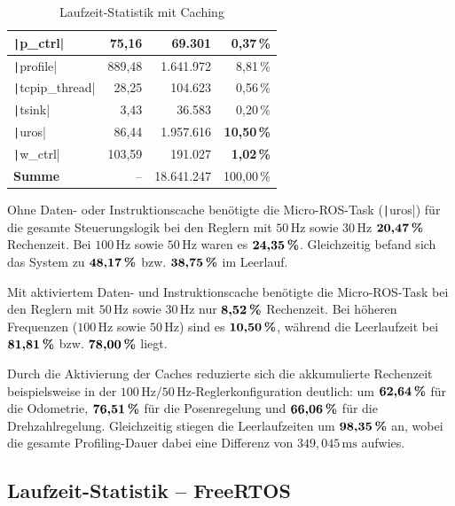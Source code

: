 \begin{table}[H]
{{\begin{minipage}[b]{0.50\hsize}
\begin{tabular}{|l|r|r|r|}
        \texttt|p_ctrl| & 75,16 & 69.301 & \textbf{0,37\,\%} \\ \hline
        \texttt|profile| & 889,48 & 1.641.972 & 8,81\,\% \\ \hline
        \texttt|tcpip_thread| & 28,25 & 104.623 & 0,56\,\% \\ \hline
        \texttt|tsink| & 3,43 & 36.583 & 0,20\,\% \\ \hline
        \texttt|uros| & 86,44 & 1.957.616 & \textbf{10,50\,\%} \\ \hline
        \texttt|w_ctrl| & 103,59 & 191.027 & \textbf{1,02\,\%} \\ \hline
        \hline
        \textbf{Summe} & -- & 18.641.247 & 100,00\,\% \\ \hline
        \end{tabular}
        \caption{Laufzeit-Statistik mit Caching}
    \end{minipage}
}}
\end{table}

Ohne Daten- oder Instruktionscache benötigte die Micro-ROS-Task
(\texttt|uros|) für die gesamte Steuerungslogik bei den Reglern mit
$50\,\text{Hz}$ sowie $30\,\text{Hz}$ $\textbf{20,47\,\%}$ Rechenzeit. Bei
$100\,\text{Hz}$ sowie $50\,\text{Hz}$ waren es $\textbf{24,35\,\%}$.
Gleichzeitig befand sich das System zu $\textbf{48,17\,\%}$ bzw.
$\textbf{38,75\,\%}$ im Leerlauf.

Mit aktiviertem Daten- und Instruktionscache benötigte die Micro-ROS-Task bei
den Reglern mit $50\,\text{Hz}$ sowie $30\,\text{Hz}$ nur $\textbf{8,52\,\%}$
Rechenzeit. Bei höheren Frequenzen ($100\,\text{Hz}$ sowie $50\,\text{Hz}$) sind
es $\textbf{10,50\,\%}$, während die Leerlaufzeit bei $\textbf{81,81\,\%}$ bzw.
$\textbf{78,00\,\%}$ liegt.

Durch die Aktivierung der Caches reduzierte sich die akkumulierte Rechenzeit
beispielsweise in der $100\,\text{Hz}/50\,\text{Hz}$-Reglerkonfiguration
deutlich: um $\textbf{62,64\,\%}$ für die Odometrie, $\textbf{76,51\,\%}$ für
die Posenregelung und $\textbf{66,06\,\%}$ für die Drehzahlregelung.
Gleichzeitig stiegen die Leerlaufzeiten um $\textbf{98,35\,\%}$ an, wobei die
gesamte Profiling-Dauer dabei eine Differenz von $349,\!045\,\text{ms}$ aufwies.

\subsection{Laufzeit-Statistik -- FreeRTOS}

